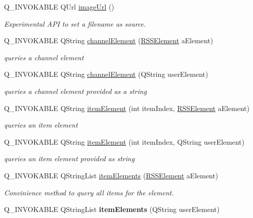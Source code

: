 \begin{DoxyCompactItemize}
\item 
Q\-\_\-\-I\-N\-V\-O\-K\-A\-B\-L\-E Q\-Url \hyperlink{class_r_s_s_parser_a19db1bd2bf2b86f39c83b1516f390c3f}{image\-Url} ()
\begin{DoxyCompactList}\small\item\em Experimental A\-P\-I to set a filename as source. \end{DoxyCompactList}\item 
Q\-\_\-\-I\-N\-V\-O\-K\-A\-B\-L\-E Q\-String \hyperlink{class_r_s_s_parser_a6c15515c743ecaf311851dbfb4fa1f0c}{channel\-Element} (\hyperlink{class_r_s_s_parser_a7abe04d86afbba935a94443444685310}{R\-S\-S\-Element} a\-Element)
\begin{DoxyCompactList}\small\item\em queries a channel element \end{DoxyCompactList}\item 
Q\-\_\-\-I\-N\-V\-O\-K\-A\-B\-L\-E Q\-String \hyperlink{class_r_s_s_parser_a04057a7945bc6575050d4afa5c68c881}{channel\-Element} (Q\-String user\-Element)
\begin{DoxyCompactList}\small\item\em queries a channel element provided as a string \end{DoxyCompactList}\item 
Q\-\_\-\-I\-N\-V\-O\-K\-A\-B\-L\-E Q\-String \hyperlink{class_r_s_s_parser_adfad03c83d5a7a433c999a15b0ef1244}{item\-Element} (int item\-Index, \hyperlink{class_r_s_s_parser_a7abe04d86afbba935a94443444685310}{R\-S\-S\-Element} a\-Element)
\begin{DoxyCompactList}\small\item\em queries an item element \end{DoxyCompactList}\item 
Q\-\_\-\-I\-N\-V\-O\-K\-A\-B\-L\-E Q\-String \hyperlink{class_r_s_s_parser_a3ac593ea0a5ea915d41db53df06dccb2}{item\-Element} (int item\-Index, Q\-String user\-Element)
\begin{DoxyCompactList}\small\item\em queries an item element provided as string \end{DoxyCompactList}\item 
Q\-\_\-\-I\-N\-V\-O\-K\-A\-B\-L\-E Q\-String\-List \hyperlink{class_r_s_s_parser_a101a710297658df267686d60fc8b224a}{item\-Elements} (\hyperlink{class_r_s_s_parser_a7abe04d86afbba935a94443444685310}{R\-S\-S\-Element} a\-Element)
\begin{DoxyCompactList}\small\item\em Convinience method to query all items for the element. \end{DoxyCompactList}\item 
\hypertarget{class_r_s_s_parser_aeb0e0b9d41605f398ed70b4a95c63b7b}{Q\-\_\-\-I\-N\-V\-O\-K\-A\-B\-L\-E Q\-String\-List {\bfseries item\-Elements} (Q\-String user\-Element)}\label{class_r_s_s_parser_aeb0e0b9d41605f398ed70b4a95c63b7b}


\end{DoxyCompactItemize}
